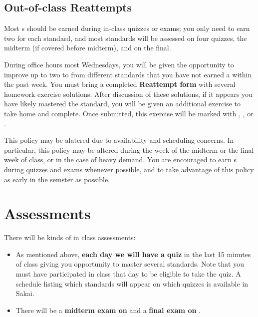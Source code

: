 {    \subsection*{\fontsize{10}{12}\selectfont Out-of-class Reattempts}
    Most \masteryMark{}s should be earned during in-class quizzes or exams;
    you only need to earn two for each standard, and most standards will be
    assessed on four quizzes, the midterm (if covered before midterm), and
    on the final.

    During office hours most Wednesdays, you will be given the opportunity to
    improve up to two \reattemptMark{} to \masteryMark{} from different
    standards that you have not earned a \masteryMark{} within the past week.
    You must bring a completed \textbf{Reattempt form} with several homework
    exercise solutions. After discussion of these solutions, if it appears you
    have likely mastered the standard,
    you will be given an additional exercise to take home and complete.
    Once submitted, this exercise will be marked with \masteryMark{},
    \minorMark{}, or \noMark{}.

    This policy may be alatered due to availability and scheduling
    concerns. In particular, this policy may be altered during the week
    of the midterm or the final week of class, or in the case of heavy
    demand. You are encouraged to earn \masteryMark{}s during quizzes and
    exams whenever possible, and to take advantage of this policy
    as early in the semster as possible.
}




\section*{\fontsize{12}{15}\selectfont Assessments}
There will be  kinds of in class assessments:
\begin{itemize}
\item As mentioned above, {\bf each day we will have a quiz} in the last 15 minutes of class giving you opportunity to master several standards.  Note that you must have participated in class that day to be eligible to take the quiz.  A schedule listing which standards will appear on which quizzes is available in Sakai.
\item There will be a {\bf midterm exam on } and a {\bf final exam on }.
\end{itemize}


